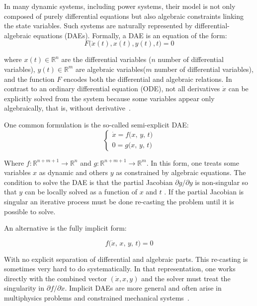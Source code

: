 In many dynamic systems, including power systems, their model is not only composed of purely differential equations but also algebraic constraints linking the state
variables. Such systems are naturally represented by differential-algebraic equations (DAEs). Formally, a DAE is an equation of the form: 
\begin{equation}
  F\bigl(\dot{x}(t), x(t), y(t), t\bigr) = 0
\end{equation}

where $x(t)\in \mathbb{R}^n$ are the differential variables ($n$ number of differential variables), $y(t)\in \mathbb{R}^m$ are algebraic variables($m$ number of differential variables),
 and the function $F$ encodes both the differential and algebraic relations. 
In contrast to an ordinary differential equation (ODE), not all derivatives $\dot{x}$ can be explicitly solved from the system because some variables appear only 
algebraically, that is, without derivative~\cite{CasellaDAE}.

One common formulation is the so-called semi-explicit DAE:  
\begin{equation}
\begin{cases}
\dot x = f\bigl(x,\,y,\,t\bigr) \\
0 = g\bigl(x,\,y,\,t\bigr)
\end{cases}
\end{equation} 

Where $f\colon \mathbb{R}^{n+m+1} \to \mathbb{R}^n$ and $g\colon \mathbb{R}^{n+m+1} \to \mathbb{R}^m$. In this form, one treats some variables $x$ as dynamic and others $y$
as constrained by algebraic equations. The condition to solve the DAE is that the partial Jacobian $\partial g / \partial y$ is non-singular so that $y$ can be locally solved as
a function of $x$ and $t$ \cite{CasellaDAE}. If the partial Jacobian is singular an iterative process must be done re-casting the problem until it is possible to solve.  

An alternative is the fully implicit form:  

\begin{equation}
f\bigl(\dot{x},\, x,\, y,\, t \bigr) = 0
\end{equation}

With no explicit separation of differential and algebraic parts. This re-casting is sometimes very hard to do systematically. In that representation, one works directly with the combined vector $(\dot{x}, x, y)$ and the solver must treat 
the singularity in $\partial f / \partial \dot{x}$. Implicit DAEs are more general and often arise in multiphysics problems and constrained mechanical systems~\cite{CasellaDAE}.  

